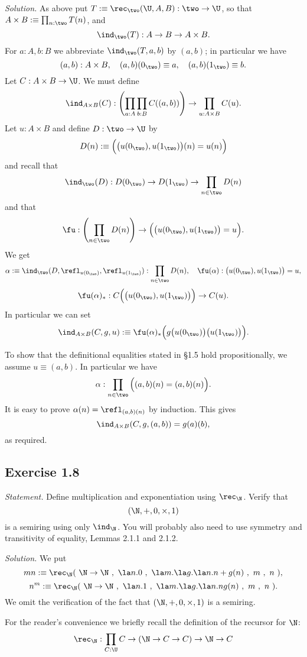 \documentclass[12pt]{article}
\begin{document}
\nn\emph{Solution.} As above put $T:\equiv\rec_\two(\U,A,B):\two\to\U$, so that $A\times B:\equiv\prod_{n:\two}T(n)$, and 
$$
\ind_\two(T):A\to B\to A\times B.
$$ 
For $a:A,b:B$ we abbreviate $\ind_\two(T,a,b)$ by $(a,b)$; in particular we have 
$$
(a,b):A\times B,\quad(a,b)(0_\two)\equiv a,\quad(a,b)(1_\two)\equiv b.
$$ 
Let $C:A\times B\to\U$. We must define 
$$
\ind_{A\times B}(C):\left(\prod_{a:A}\prod_{b:B}C((a,b))\right)\to\prod_{u:A\times B}C(u).
$$ 
Let $u:A\times B$ and define $D:\two\to\U$ by 
$$
D(n):\equiv\Big(\big(u(0_\two),u(1_\two)\big)(n)=u(n)\Big)
$$ 
and recall that 
$$
\ind_\two(D):D(0_\two)\to D(1_\two)\to\prod_{n\in\two}D(n)
$$ 
and that 
$$
\fu:\left(\prod_{n\in\two}D(n)\right)\to\Big(\big(u(0_\two),u(1_\two)\big)=u\Big).
$$
We get 
$$
\alpha:\equiv\ind_\two(D,\refl_{u(0_\two)},\refl_{u(1_\two)}):\prod_{n\in\two}D(n),\quad\fu(\alpha):\big(u(0_\two),u(1_\two)\big)=u,
$$
$$
\fu(\alpha)_*:C\Big(\big(u(0_\two),u(1_\two)\big)\Big)\to C(u).
$$
In particular we can set
$$
\ind_{A\times B}(C,g,u):\equiv\fu(\alpha)_*\Big(g\big(u(0_\two)\big)\big(u(1_\two)\big)\Big).
$$

To show that the definitional equalities stated in \S1.5 hold propositionally, we assume $u\equiv(a,b)$. In particular we have 
$$
\alpha:\prod_{n\in\two}\Big((a,b)(n)=(a,b)(n)\Big).
$$ 
It is easy to prove $\alpha(n)=\refl_{(a,b)(n)}$ by induction. This gives 
$$
\ind_{A\times B}(C,g,(a,b))=g(a)(b),
$$ 
as required.


\subsection{Exercise 1.8}

\emph{Statement.} Define multiplication and exponentiation using $\rec_\N$. Verify that $$(\N,+,0,\times,1)$$ is a semiring using only $\ind_\N$. You will probably also need to use symmetry and transitivity of equality, Lemmas 2.1.1 and 2.1.2.

\nn\emph{Solution.} We put 
$$
mn:\equiv\rec_\N(\ \N\to\N\ ,\ \la n.0\ ,\ \la m.\la g.\la n.n+g(n)\ ,\ m\ ,\ n\ ),
$$
$$
n^m:\equiv\rec_\N(\ \N\to\N\ ,\ \la n.1\ ,\ \la m.\la g.\la n.ng(n)\ ,\ m\ ,\ n\ ).
$$ 
We omit the verification of the fact that $(\N,+,0,\times,1)$ is a semiring.

For the reader's convenience we briefly recall the definition of the recursor for $\N$:
$$\rec_\N:\prod_{C:\U}C\to(\N\to C\to C)\to\N\to C$$
\end{document}
